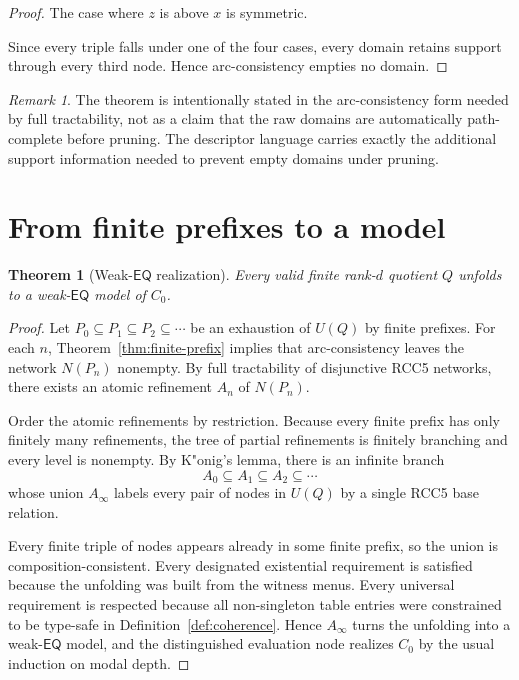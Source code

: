 \documentclass[11pt]{article}
\newtheorem{theorem}[definition]{Theorem}
\theoremstyle{remark}
\newtheorem{remark}[definition]{Remark}
\newcommand{\EQ}{\mathsf{EQ}}
\begin{document}
\begin{proof}
The case where $z$ is above $x$ is symmetric.

Since every triple falls under one of the four cases, every domain retains support through every third node. Hence arc-consistency empties no domain.
\end{proof}

\begin{remark}
The theorem is intentionally stated in the arc-consistency form needed by full tractability, not as a claim that the raw domains are automatically path-complete before pruning. The descriptor language carries exactly the additional support information needed to prevent empty domains under pruning.
\end{remark}

\section{From finite prefixes to a model}

\begin{theorem}[Weak-$\EQ$ realization]\label{thm:weak-model}
Every valid finite rank-$d$ quotient $Q$ unfolds to a weak-$\EQ$ model of $C_0$.
\end{theorem}

\begin{proof}
Let $P_0\subseteq P_1\subseteq P_2\subseteq\cdots$ be an exhaustion of $U(Q)$ by finite prefixes. For each $n$, Theorem~\ref{thm:finite-prefix} implies that arc-consistency leaves the network $N(P_n)$ nonempty. By full tractability of disjunctive RCC5 networks, there exists an atomic refinement $A_n$ of $N(P_n)$.

Order the atomic refinements by restriction. Because every finite prefix has only finitely many refinements, the tree of partial refinements is finitely branching and every level is nonempty. By K"onig's lemma, there is an infinite branch
\[
A_0\subseteq A_1\subseteq A_2\subseteq\cdots
\]
whose union $A_\infty$ labels every pair of nodes in $U(Q)$ by a single RCC5 base relation.

Every finite triple of nodes appears already in some finite prefix, so the union is composition-consistent. Every designated existential requirement is satisfied because the unfolding was built from the witness menus. Every universal requirement is respected because all non-singleton table entries were constrained to be type-safe in Definition~\ref{def:coherence}. Hence $A_\infty$ turns the unfolding into a weak-$\EQ$ model, and the distinguished evaluation node realizes $C_0$ by the usual induction on modal depth.
\end{proof}
\end{document}
